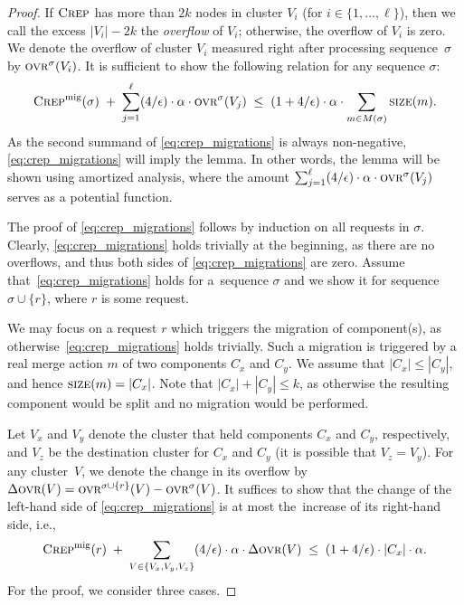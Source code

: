 \begin{proof}
If $\textsc{Crep}$ has more than $2 k$ nodes in cluster $V_i$ (for $i \in
\{1,\ldots,\ell\}$), then we call the excess $|V_i| - 2 k$ the \emph{overflow} of $V_i$;
otherwise, the overflow of $V_i$ is zero. We denote the overflow of cluster
$V_i$ measured right after processing sequence~$\sigma$ by $\textsc{ovr}^\sigma(V_i)$.
It is sufficient to show the following relation for any sequence $\sigma$:
\begin{equation}
\label{eq:crep_migrations}
 \textsc{Crep}^\textnormal{mig}(\sigma) \;+\; \sum_{j=1}^\ell (4/\epsilon) \cdot \alpha \cdot \textsc{ovr}^\sigma(V_j) 
 \; \leq \; (1+4/\epsilon)  \cdot \alpha \cdot \sum_{m \in M(\sigma)} \textsc{size}(m).
\end{equation}
As the second summand of \eqref{eq:crep_migrations} is always non-negative,
\eqref{eq:crep_migrations} will imply the lemma. 
In other words, the lemma will be shown using amortized analysis, where
the amount $\sum_{j=1}^\ell (4/\epsilon) \cdot \alpha \cdot \textsc{ovr}^\sigma(V_j)$ serves 
as a potential function.

The proof of \eqref{eq:crep_migrations} follows by induction on all
requests in $\sigma$. Clearly, \eqref{eq:crep_migrations} holds trivially at the
beginning, as there are no overflows, and thus both sides of
\eqref{eq:crep_migrations} are zero. Assume that~\eqref{eq:crep_migrations}
holds for a~sequence $\sigma$ and we show it for sequence $\sigma \cup \{ r \}$,
where $r$ is some request.

We may focus on a request $r$ which triggers the migration of
component(s), as otherwise~\eqref{eq:crep_migrations} holds trivially. Such a migration is triggered by a
real merge action $m$ of two components $C_x$ and $C_y$. We assume that $|C_x|
\leq |C_y|$, and hence $\textsc{size}(m) = |C_x|$. Note that $|C_x| + |C_y| \leq k$,
as otherwise the resulting component would be split and no migration would
be performed.

Let $V_x$ and $V_y$ denote the cluster that held components $C_x$ and $C_y$,
respectively, and $V_z$ be the destination cluster for $C_x$ and $C_y$ (it is
possible that $V_z = V_y$). For any cluster~$V$, we denote the change in 
its overflow by $\Delta \textsc{ovr}(V) = \textsc{ovr}^{\sigma \cup \{r\}}(V) - \textsc{ovr}^\sigma(V)$. 
It suffices to show that the
change of the left-hand side of \eqref{eq:crep_migrations} is at most
the~increase of its right-hand side, i.e.,
\begin{equation}
\label{eq:crep_mig_inc}
\textsc{Crep}^\textnormal{mig}(r) \;+\; \sum_{V \in \{ V_x, V_y, V_z \}} (4/\epsilon) \cdot \alpha \cdot \Delta\textsc{ovr}(V) 
\;\leq\; (1+4/\epsilon) \cdot |C_x| \cdot \alpha.
\end{equation}
For the proof, we consider three cases.


\end{proof}

